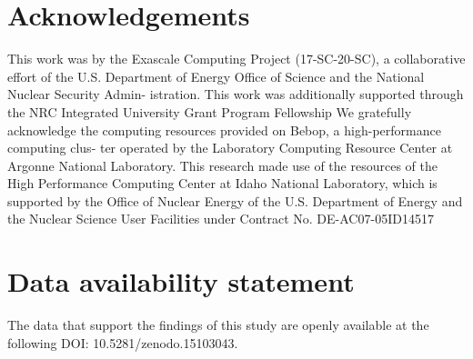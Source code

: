 \documentclass[a4paper,fleqn]{cas-sc}
\begin{document}

\printcredits

\section*{Acknowledgements}
This work was by the Exascale Computing Project (17-SC-20-SC), a collaborative
effort of the U.S. Department of Energy Office of Science and the National
Nuclear Security Admin- istration. This work was additionally supported through
the NRC Integrated University Grant Program Fellowship %
We gratefully acknowledge the computing resources provided on Bebop, a
high-performance computing clus- ter operated by the Laboratory Computing
Resource Center at Argonne National Laboratory.  This research made use of the
resources of the High Performance Computing Center at Idaho National Laboratory,
which is supported by the Office of Nuclear Energy of the U.S. Department of
Energy and the Nuclear Science User Facilities under Contract No.
DE-AC07-05ID14517

\section*{Data availability statement}
The data that support the findings of this study are openly available at the
following DOI: 10.5281/zenodo.15103043.

%





\end{document}
